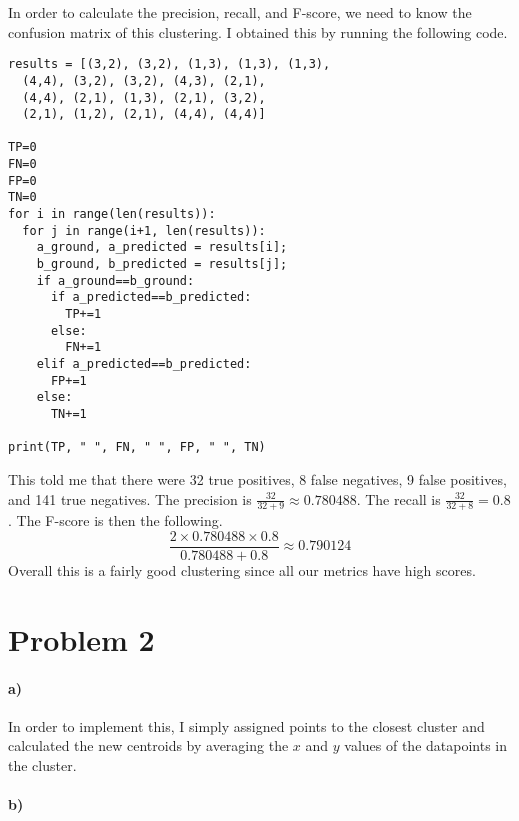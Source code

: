 \documentclass[12pt]{article}
\begin{document}
In order to calculate the precision, recall, and F-score, we need to know the confusion matrix of this clustering.
I obtained this by running the following code.
\begin{verbatim}
results = [(3,2), (3,2), (1,3), (1,3), (1,3),
  (4,4), (3,2), (3,2), (4,3), (2,1),
  (4,4), (2,1), (1,3), (2,1), (3,2),
  (2,1), (1,2), (2,1), (4,4), (4,4)]

TP=0
FN=0
FP=0
TN=0
for i in range(len(results)):
  for j in range(i+1, len(results)):
    a_ground, a_predicted = results[i];
    b_ground, b_predicted = results[j];
    if a_ground==b_ground:
      if a_predicted==b_predicted:
        TP+=1
      else:
        FN+=1
    elif a_predicted==b_predicted:
      FP+=1
    else:
      TN+=1

print(TP, " ", FN, " ", FP, " ", TN)
\end{verbatim}
This told me that there were 32 true positives, 8 false negatives, 9 false positives, and 141 true negatives.
The precision is \(\frac{32}{32+9}\approx0.780488\). The recall is \(\frac{32}{32+8}=0.8\). The F-score is then
the following.
\[\frac{2\times0.780488\times0.8}{0.780488+0.8}\approx0.790124\]
Overall this is a fairly good clustering since all our metrics have high scores.

\section*{Problem 2}

\paragraph{a)}

In order to implement this, I simply assigned points to the closest cluster and calculated the new centroids by
averaging the \(x\) and \(y\) values of the datapoints in the cluster.

\paragraph{b)}
\end{document}
